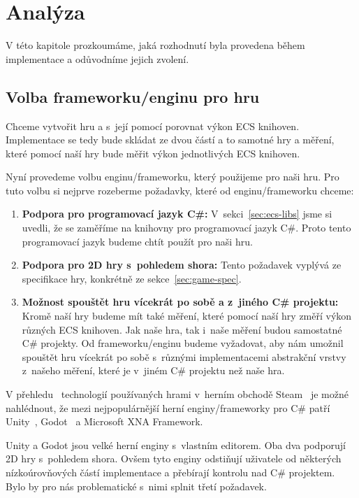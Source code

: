 \chapter{Analýza}
\label{chap:analysis}
V této kapitole prozkoumáme, jaká rozhodnutí byla provedena během implementace a odůvodníme jejich zvolení.


\section{Volba frameworku/enginu pro hru}
Chceme vytvořit hru a s~její pomocí porovnat výkon ECS knihoven. Implementace se tedy bude skládat ze dvou částí a to samotné hry a měření, které pomocí naší hry bude měřit výkon jednotlivých ECS knihoven.

Nyní provedeme volbu enginu/frameworku, který použijeme pro naši hru. Pro tuto volbu si nejprve rozeberme požadavky, které od enginu/frameworku chceme:

\begin{enumerate}
    \item \textbf{Podpora pro programovací jazyk C\#:} V~sekci~\ref{sec:ecs-libs} jsme si uvedli, že se zaměříme na knihovny pro programovací jazyk C\#. Proto tento programovací jazyk budeme chtít použít pro naši hru.
    \item \textbf{Podpora pro 2D hry s~pohledem shora:} Tento požadavek vyplývá ze specifikace hry, konkrétně ze sekce~\ref{sec:game-spec}.
    \item \textbf{Možnost spouštět hru vícekrát po sobě a z~jiného C\# projektu:} Kromě naší hry budeme mít také měření, které pomocí naší hry změří výkon různých ECS knihoven. Jak naše hra, tak i~naše měření budou samostatné C\# projekty. Od frameworku/enginu budeme vyžadovat, aby nám umožnil spouštět hru vícekrát po sobě s~různými implementacemi abstrakční vrstvy z~našeho měření, které je v~jiném C\# projektu než naše hra.    
\end{enumerate}

V přehledu~\cite{SteamDB} technologií používaných hrami v~herním obchodě Steam~\cite{Steam} je možné nahlédnout, že mezi nejpopulárnější herní enginy/frameworky pro C\# patří Unity~\cite{Unity}, Godot~\cite{Godot} a Microsoft XNA Framework.

Unity a Godot jsou velké herní enginy s~vlastním editorem. Oba dva podporují 2D hry s~pohledem shora. Ovšem tyto enginy odstiňují uživatele od některých nízkoúrovňových částí implementace a přebírají kontrolu nad C\# projektem. Bylo by pro nás problematické s~nimi splnit třetí požadavek.

